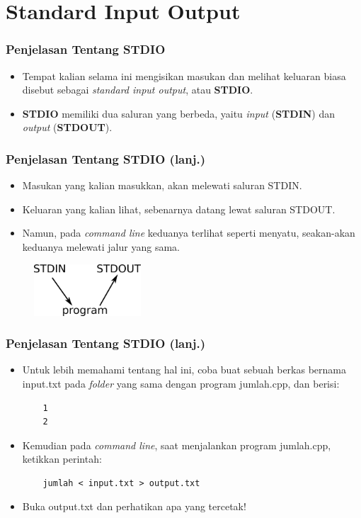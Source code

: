 \section{Standard Input Output}
\frame{\sectionpage}

\begin{frame}
\frametitle{Penjelasan Tentang STDIO}
\begin{itemize}
  \item Tempat kalian selama ini mengisikan masukan dan melihat keluaran biasa disebut sebagai \textit{standard input output}, atau \textbf{STDIO}.
  \item \textbf{STDIO} memiliki dua saluran yang berbeda, yaitu \textit{input} (\textbf{STDIN}) dan \textit{output} (\textbf{STDOUT}).
\end{itemize}
\end{frame}

\begin{frame}
\frametitle{Penjelasan Tentang STDIO (lanj.)}
\begin{itemize}
  \item Masukan yang kalian masukkan, akan melewati saluran STDIN.
  \item Keluaran yang kalian lihat, sebenarnya datang lewat saluran STDOUT.
  \item Namun, pada \textit{command line} keduanya terlihat seperti menyatu, seakan-akan keduanya melewati jalur yang sama.
\end{itemize}
\begin{figure}
  \includegraphics[width=4cm]{asset/g1.png}
\end{figure}
\end{frame}

\begin{frame}[fragile]
\frametitle{Penjelasan Tentang STDIO (lanj.)}
\begin{itemize}
  \item Untuk lebih memahami tentang hal ini, coba buat sebuah berkas bernama input.txt pada \textit{folder} yang sama dengan program jumlah.cpp, dan berisi:
  \begin{lstlisting}
    1
    2
  \end{lstlisting}
  \item Kemudian pada \textit{command line}, saat menjalankan program jumlah.cpp, ketikkan perintah:
  \begin{lstlisting}
    jumlah < input.txt > output.txt
  \end{lstlisting}
  \item Buka output.txt dan perhatikan apa yang tercetak!
\end{itemize}
\end{frame}

